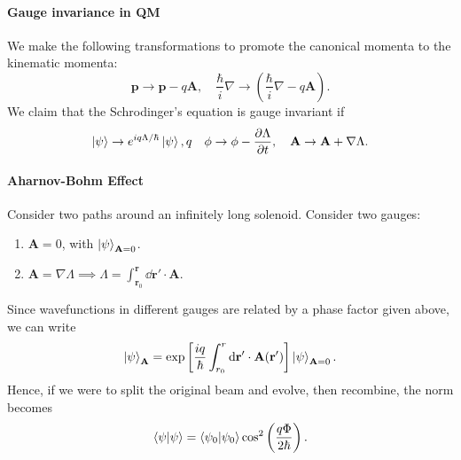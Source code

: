 \documentclass{article}
\begin{document}
\paragraph{Gauge invariance in QM}
We make the following transformations to promote the canonical momenta to the kinematic momenta:
$$\mathbf p\to\mathbf p-q\mathbf A,\quad\frac\hbar i\nabla\to\left(\frac\hbar i\nabla-q\mathbf A\right).$$
We claim that the Schrodinger's equation is gauge invariant if 
$$\ket\psi\to e^{iq\Lambda/\hbar}\ket\psi,q\quad \phi\to\phi- \frac{\partial \Lambda}{\partial t},\quad\mathbf A\to\mathbf A+\nabla\Lambda.$$

\paragraph{Aharnov-Bohm Effect}
Consider two paths around an infinitely long solenoid. Consider two gauges:
\begin{enumerate}[label=(\alph*)]
    \item $\mathbf A=0$, with $\ket\psi_{\mathbf A=0}$.
    \item $\mathbf A=\nabla\Lambda\implies\Lambda=\int^{\mathbf r}_{\mathbf r_0}\dd\mathbf r'\cdot\mathbf A$.
\end{enumerate}
Since wavefunctions in different gauges are related by a phase factor given above, we can write 
$$\ket\psi_{\mathbf A}=\exp\left[\frac{iq}\hbar\int^r_{r_0}\dd\mathbf r'\cdot\mathbf A(\mathbf r')\right]\ket\psi_{\mathbf A=0}.$$
Hence, if we were to split the original beam and evolve, then recombine, the norm becomes 
$$\braket\psi=\braket{\psi_0}{\psi_0}\cos^2\left(\frac{q\Phi}{2\hbar}\right).$$
\end{document}
